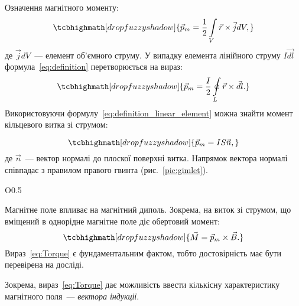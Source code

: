 Означення магнітного моменту:
\begin{equation}\label{eq:definition}
	\tcbhighmath[drop fuzzy shadow]{
		\vec{p}_m = \frac12 \int\limits_V \vec{r} \times \vec{j} dV,
	}
\end{equation}
де $\vec{j} dV$~--- елемент об'ємного струму. У випадку елемента лінійного струму $I\vec{dl}$ формула~\eqref{eq:definition} перетворюється на вираз:
\begin{equation}\label{eq:definition_linear_element}
	\tcbhighmath[drop fuzzy shadow]{
		\vec{p}_m = \frac{I}{2} \oint\limits_L \vec{r} \times \vec{dl}.
	}
\end{equation}
Використовуючи формулу~\eqref{eq:definition_linear_element} можна знайти момент кільцевого витка зі струмом:

\begin{equation}\label{eq:circuit}
	\tcbhighmath[drop fuzzy shadow]{
		\vec{p}_m = IS\vec{n},
	}
\end{equation}
де $\vec{n}$~--- вектор нормалі до плоскої поверхні витка. Напрямок вектора нормалі співпадає з правилом правого гвинта (рис.~\ref{pic:gimlet}).

\begin{wrapfigure}{O}{0.5\linewidth}\centering
	\caption{Полюса витка}
	\label{pic:gimlet}
\end{wrapfigure}

Магнітне поле впливає на магнітний диполь. Зокрема, на виток зі струмом, що вміщений в однорідне магнітне поле діє обертовий момент:
\begin{equation}\label{eq:Torque}
	\tcbhighmath[drop fuzzy shadow]{
		\vec{M} = \vec{p}_m\times \vec{B}.
	}
\end{equation}
Вираз~\eqref{eq:Torque} є фундаментальним фактом, тобто достовірність має бути перевірена на досліді.

Зокрема, вираз~\eqref{eq:Torque} дає можливість ввести кількісну характеристику  магнітного поля~--- \emph{вектора індукції}.

